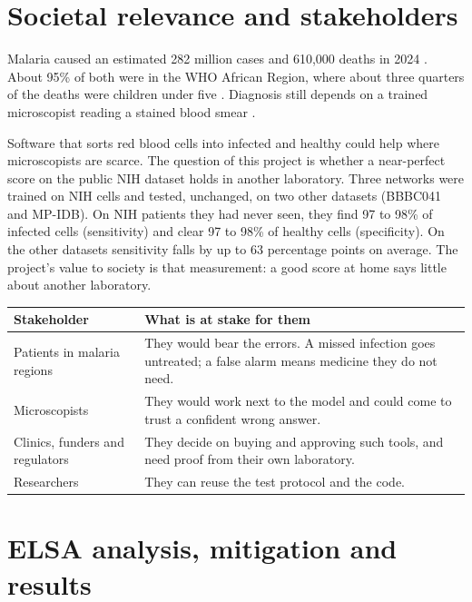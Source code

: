 \documentclass[11pt,a4paper]{article}
\begin{document}
\section{Societal relevance and stakeholders}

Malaria caused an estimated 282 million cases and 610,000 deaths in 2024 \citep{who2025}. About 95\% of both were in the WHO African Region, where about three quarters of the deaths were children under five \citep{whomalaria}. Diagnosis still depends on a trained microscopist reading a stained blood smear \citep{rajaraman2018}.

Software that sorts red blood cells into infected and healthy could help where microscopists are scarce. The question of this project is whether a near-perfect score on the public NIH dataset holds in another laboratory. Three networks were trained on NIH cells and tested, unchanged, on two other datasets (BBBC041 and MP-IDB). On NIH patients they had never seen, they find 97 to 98\% of infected cells (sensitivity) and clear 97 to 98\% of healthy cells (specificity). On the other datasets sensitivity falls by up to 63 percentage points on average. The project's value to society is that measurement: a good score at home says little about another laboratory.

{\small
\begin{longtable}{@{}>{\raggedright\arraybackslash}p{115.4pt}>{\raggedright\arraybackslash}p{300.6pt}@{}}
\toprule
Stakeholder & What is at stake for them \\
\midrule
\endhead
\bottomrule
\endfoot
\bottomrule
\endlastfoot
Patients in malaria regions & They would bear the errors. A missed infection goes untreated; a false alarm means medicine they do not need. \\
Microscopists & They would work next to the model and could come to trust a confident wrong answer. \\
Clinics, funders and regulators & They decide on buying and approving such tools, and need proof from their own laboratory. \\
Researchers & They can reuse the test protocol and the code. \\
\end{longtable}}
\addtocounter{table}{-1}

\section{ELSA analysis, mitigation and results}
\end{document}
